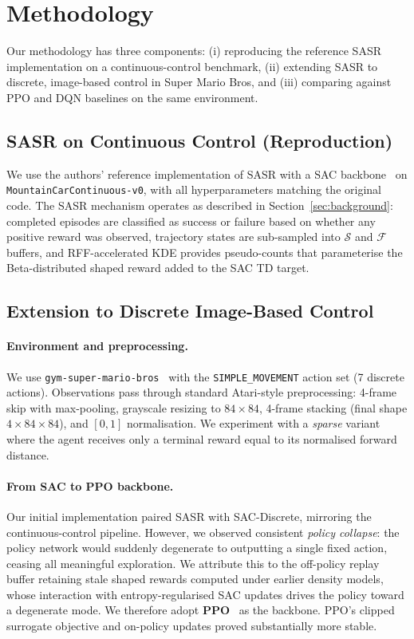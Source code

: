 \documentclass{article}
\begin{document}
\section{Methodology}
\label{sec:methodology}

Our methodology has three components: (i) reproducing the reference SASR implementation on a continuous-control benchmark, (ii) extending SASR to discrete, image-based control in Super Mario Bros, and (iii) comparing against PPO and DQN baselines on the same environment.

\subsection{SASR on Continuous Control (Reproduction)}

We use the authors' reference implementation of SASR with a SAC backbone~\citep{haarnoja2018sac} on \texttt{MountainCarContinuous-v0}, with all hyperparameters matching the original code. The SASR mechanism operates as described in Section~\ref{sec:background}: completed episodes are classified as success or failure based on whether any positive reward was observed, trajectory states are sub-sampled into $\mathcal{S}$ and $\mathcal{F}$ buffers, and RFF-accelerated KDE provides pseudo-counts that parameterise the Beta-distributed shaped reward added to the SAC TD target.

\subsection{Extension to Discrete Image-Based Control}

\paragraph{Environment and preprocessing.}
We use \texttt{gym-super-mario-bros}~\citep{gym-super-mario-bros} with the \texttt{SIMPLE\_MOVEMENT} action set (7 discrete actions). Observations pass through standard Atari-style preprocessing: 4-frame skip with max-pooling, grayscale resizing to $84 \times 84$, 4-frame stacking (final shape $4 \times 84 \times 84$), and $[0, 1]$ normalisation. We experiment with a \emph{sparse} variant where the agent receives only a terminal reward equal to its normalised forward distance.

\paragraph{From SAC to PPO backbone.}
Our initial implementation paired SASR with SAC-Discrete, mirroring the continuous-control pipeline. However, we observed consistent \emph{policy collapse}: the policy network would suddenly degenerate to outputting a single fixed action, ceasing all meaningful exploration. We attribute this to the off-policy replay buffer retaining stale shaped rewards computed under earlier density models, whose interaction with entropy-regularised SAC updates drives the policy toward a degenerate mode. We therefore adopt \textbf{PPO}~\citep{schulman2017proximal} as the backbone. PPO's clipped surrogate objective and on-policy updates proved substantially more stable.
\end{document}
